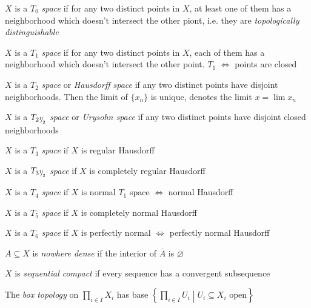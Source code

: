 \documentclass[main]{subfiles}
\begin{document}
\begin{definition}
$X$ is a $T_0$ \textit{space} if for any two distinct points in $X$, at least one of them has a neighborhood which doesn't intersect the other piont, i.e. they are \textit{topologically distinguishable} \par
$X$ is a $T_1$ \textit{space} if for any two distinct points in $X$, each of them has a neighborhood which doesn't intersect the other point. $T_1$ $\Leftrightarrow$ points are closed \par
$X$ is a $T_2$ \textit{space} or \textit{Hausdorff space} if any two distinct points have disjoint neighborhoods. Then the limit of $\{x_n\}$ is unique, denotes the limit $x=\lim x_n$ \par
$X$ is a $T_{2 {}^1{\mskip -5mu/\mskip -3mu}_2}$ \textit{space} or \textit{Urysohn space} if any two distinct points have disjoint closed neighborhoods \par
$X$ is a $T_3$ \textit{space} if $X$ is regular Hausdorff \par
$X$ is a $T_{3 {}^1{\mskip -5mu/\mskip -3mu}_2}$ \textit{space} if $X$ is completely regular Hausdorff \par
$X$ is a $T_4$ \textit{space} if $X$ is normal $T_1$ space $\Leftrightarrow$ normal Hausdorff \par
$X$ is a $T_5$ \textit{space} if $X$ is completely normal Hausdorff \par
$X$ is a $T_6$ \textit{space} if $X$ is perfectly normal $\Leftrightarrow$ perfectly normal Hausdorff
\end{definition}

\begin{definition}
$A\subseteq X$ is \textit{nowhere dense} if the interior of $\overline{A}$ is $\varnothing$
\end{definition}

\begin{definition}
$X$ is \textit{sequential compact} if every sequence has a convergent subsequence
\end{definition}

\begin{definition}
The \textit{box topology} on $\displaystyle\prod_{i\in I}X_i$ has base $\displaystyle\left\{\prod_{i\in I} U_i\middle|U_i\subseteq X_i\text{ open}\right\}$
\end{definition}
\end{document}
